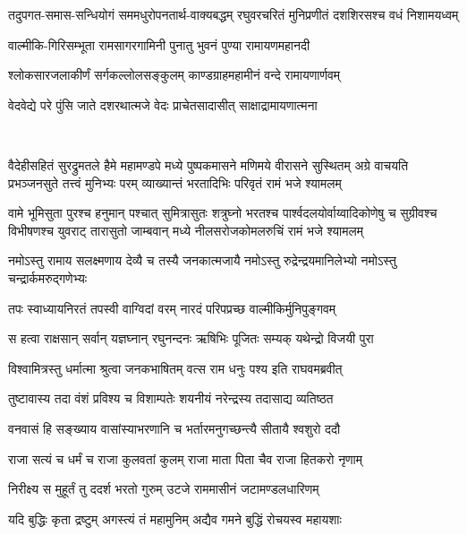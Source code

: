 \twolineshloka
{तदुपगत-समास-सन्धियोगं सममधुरोपनतार्थ-वाक्यबद्धम्}
{रघुवरचरितं मुनिप्रणीतं दशशिरसश्च वधं निशामयध्वम्}

\twolineshloka
{वाल्मीकि-गिरिसम्भूता रामसागरगामिनी}
{पुनातु भुवनं पुण्या रामायणमहानदी}

\twolineshloka
{श्लोकसारजलाकीर्णं सर्गकल्लोलसङ्कुलम्}
{काण्डग्राहमहामीनं वन्दे रामायणार्णवम्}

\twolineshloka
{वेदवेद्ये परे पुंसि जाते दशरथात्मजे}
{वेदः प्राचेतसादासीत् साक्षाद्रामायणात्मना}

\mbox{}\\
\resetShloka
{}

\fourlineindentedshloka
{वैदेहीसहितं सुरद्रुमतले हैमे महामण्डपे}
{मध्ये पुष्पकमासने मणिमये वीरासने सुस्थितम्}
{अग्रे वाचयति प्रभञ्जनसुते तत्त्वं मुनिभ्यः परम्}
{व्याख्यान्तं भरतादिभिः परिवृतं रामं भजे श्यामलम्}

\fourlineindentedshloka
{वामे भूमिसुता पुरश्च हनुमान् पश्चात् सुमित्रासुतः}
{शत्रुघ्नो भरतश्च पार्श्वदलयोर्वाय्वादिकोणेषु च}
{सुग्रीवश्च विभीषणश्च युवराट् तारासुतो जाम्बवान्}
{मध्ये नीलसरोजकोमलरुचिं रामं भजे श्यामलम्}

\twolineshloka
{नमोऽस्तु रामाय सलक्ष्मणाय देव्यै च तस्यै जनकात्मजायै}
{नमोऽस्तु रुद्रेन्द्रयमानिलेभ्यो नमोऽस्तु चन्द्रार्कमरुद्गणेभ्यः}

\resetShloka
{}
\twolineshloka
{तपः स्वाध्यायनिरतं तपस्वी वाग्विदां वरम्}
{नारदं परिपप्रच्छ वाल्मीकिर्मुनिपुङ्गवम्}%

\twolineshloka
{स हत्वा राक्षसान् सर्वान् यज्ञघ्नान् रघुनन्दनः}
{ऋषिभिः पूजितः सम्यक् यथेन्द्रो विजयी पुरा}%

\twolineshloka
{विश्वामित्रस्तु धर्मात्मा श्रुत्वा जनकभाषितम्}
{वत्स राम धनुः पश्य इति राघवमब्रवीत्}%

\twolineshloka
{तुष्टावास्य तदा वंशं  प्रविश्य च विशाम्पतेः}
{शयनीयं नरेन्द्रस्य तदासाद्य व्यतिष्ठत}%

\twolineshloka
{वनवासं हि सङ्ख्याय वासांस्याभरणानि च}
{भर्तारमनुगच्छन्त्यै सीतायै श्वशुरो ददौ}%

\twolineshloka
{राजा सत्यं च धर्मं च  राजा कुलवतां कुलम्}
{राजा माता पिता चैव राजा हितकरो नृणाम्}%

\twolineshloka
{निरीक्ष्य स मुहूर्तं तु ददर्श भरतो गुरुम्}
{उटजे राममासीनं जटामण्डलधारिणम्}%

\twolineshloka
{यदि बुद्धिः कृता द्रष्टुम् अगस्त्यं तं महामुनिम्}
{अद्यैव गमने बुद्धिं रोचयस्व महायशाः}%

